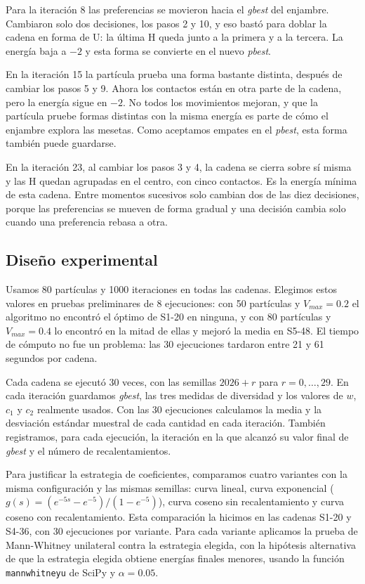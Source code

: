 Para la iteración 8 las preferencias se movieron hacia el \textit{gbest} del enjambre. Cambiaron solo dos decisiones, los pasos 2 y 10, y eso bastó para doblar la cadena en forma de U: la última H queda junto a la primera y a la tercera. La energía baja a $-2$ y esta forma se convierte en el nuevo \textit{pbest}.

En la iteración 15 la partícula prueba una forma bastante distinta, después de cambiar los pasos 5 y 9. Ahora los contactos están en otra parte de la cadena, pero la energía sigue en $-2$. No todos los movimientos mejoran, y que la partícula pruebe formas distintas con la misma energía es parte de cómo el enjambre explora las mesetas. Como aceptamos empates en el \textit{pbest}, esta forma también puede guardarse.

En la iteración 23, al cambiar los pasos 3 y 4, la cadena se cierra sobre sí misma y las H quedan agrupadas en el centro, con cinco contactos. Es la energía mínima de esta cadena. Entre momentos sucesivos solo cambian dos de las diez decisiones, porque las preferencias se mueven de forma gradual y una decisión cambia solo cuando una preferencia rebasa a otra.

\subsection{Diseño experimental}
\label{sec:diseno}

Usamos 80 partículas y 1000 iteraciones en todas las cadenas. Elegimos estos valores en pruebas preliminares de 8 ejecuciones: con 50 partículas y $V_{max} = 0.2$ el algoritmo no encontró el óptimo de S1-20 en ninguna, y con 80 partículas y $V_{max} = 0.4$ lo encontró en la mitad de ellas y mejoró la media en S5-48. El tiempo de cómputo no fue un problema: las 30 ejecuciones tardaron entre 21 y 61 segundos por cadena.

Cada cadena se ejecutó 30 veces, con las semillas $2026 + r$ para $r = 0, \dots, 29$. En cada iteración guardamos \textit{gbest}, las tres medidas de diversidad y los valores de $w$, $c_1$ y $c_2$ realmente usados. Con las 30 ejecuciones calculamos la media y la desviación estándar muestral de cada cantidad en cada iteración. También registramos, para cada ejecución, la iteración en la que alcanzó su valor final de \textit{gbest} y el número de recalentamientos.

Para justificar la estrategia de coeficientes, comparamos cuatro variantes con la misma configuración y las mismas semillas: curva lineal, curva exponencial ($g(s) = (e^{-5s} - e^{-5})/(1 - e^{-5})$), curva coseno sin recalentamiento y curva coseno con recalentamiento. Esta comparación la hicimos en las cadenas S1-20 y S4-36, con 30 ejecuciones por variante. Para cada variante aplicamos la prueba de Mann-Whitney unilateral contra la estrategia elegida, con la hipótesis alternativa de que la estrategia elegida obtiene energías finales menores, usando la función \texttt{mannwhitneyu} de SciPy y $\alpha = 0.05$.
